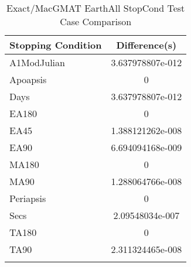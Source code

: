 \begin{table}[htbp!]
\centering
\caption{ Exact/MacGMAT EarthAll StopCond Test Case Comparison}
      \begin{tabular}{lc}
      \hline\hline
          Stopping Condition & Difference(s) \\
         \hline
         A1ModJulian & 3.637978807e-012 \\
         Apoapsis & 0 \\
         Days & 3.637978807e-012 \\
         EA180 & 0 \\
         EA45 & 1.388121262e-008 \\
         EA90 & 6.694094168e-009 \\
         MA180 & 0 \\
         MA90 & 1.288064766e-008 \\
         Periapsis & 0 \\
         Secs & 2.09548034e-007 \\
         TA180 & 0 \\
         TA90 & 2.311324465e-008 \\
      \hline\hline
      \label{Table: Exact-MacGMAT EarthAll StopCond Table} 
\end{tabular}
\end{table}
